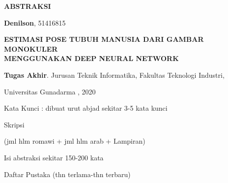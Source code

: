 \newpage %
\begin{center}
\begin{large}\textbf{ABSTRAKSI}\end{large}
\end{center}

\vspace{5mm} 

\noindent \textbf{Denilson}, 51416815

\noindent \textbf{ESTIMASI POSE TUBUH MANUSIA DARI GAMBAR 
MONOKULER \\ MENGGUNAKAN DEEP NEURAL NETWORK}

\noindent \textbf{Tugas Akhir}. Jurusan Teknik Informatika, Fakultas Teknologi Industri, 

\noindent Universitas Gunadarma , 2020

\noindent Kata Kunci : dibuat urut abjad sekitar 3-5 kata kunci

\noindent Skripsi

\noindent (jml hlm romawi + jml hlm arab + Lampiran)

\vspace{0.5cm}
\noindent Isi abstraksi sekitar 150-200 kata

\noindent Daftar Pustaka (thn terlama-thn terbaru)
